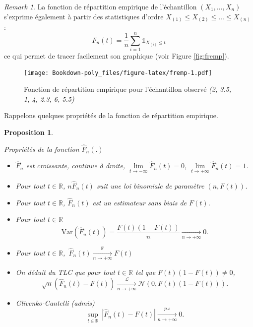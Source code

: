 \documentclass[
]{book}
\providecommand{\tightlist}{%
  \setlength{\itemsep}{0pt}\setlength{\parskip}{0pt}}
\newtheorem{proposition}{Proposition}[chapter]
\theoremstyle{definition}
\theoremstyle{definition}
\theoremstyle{definition}
\theoremstyle{definition}
\theoremstyle{remark}
\newtheorem*{remark}{Remark}
\begin{document}
\begin{remark}

La fonction de répartition empirique de l'échantillon \((X_1,\ldots,X_n)\) s'exprime également à partir des statistiques d'ordre \(X_{(1)}\leq X_{(2)}\leq \ldots\leq X_{(n)}\) :
\[
    \hat{F}_n(t)=\frac 1n \sum_{i=1}^n \mathbb{1}_{X_{(i)} \leq t}
\]
ce qui permet de tracer facilement son graphique (voir Figure \ref{fig:fremp}).

\end{remark}

\begin{figure}
\centering
\texttt{[image: Bookdown-poly\_files/figure-latex/fremp-1.pdf]}
\caption{\label{fig:fremp}\label{fremp} Fonction de répartition empirique pour l'échantillon observé \emph{(2, 3.5, 1, 4, 2.3, 6, 5.5)}}
\end{figure}

Rappelons quelques propriétés de la fonction de répartition empirique.

\begin{proposition}
\protect\hypertarget{prp:unlabeled-div-16}{}\label{prp:unlabeled-div-16}

Propriétés de la fonction \(\hat{F}_n(.)\)

\begin{itemize}
\tightlist
\item
  \(\hat{F}_n\) est croissante, continue à droite, \(\underset{t\rightarrow -\infty}{\lim}\hat{F}_n(t)=0\), \(\underset{t\rightarrow +\infty}{\lim}\hat F_n(t)=1\).
\item
  Pour tout \(t\in\mathbb{R}\), \(n \hat{F}_n(t)\) suit une loi binomiale de paramètre \((n, F(t))\).
\item
  Pour tout \(t\in\mathbb{R}\), \(\hat{F}_n(t)\) est un estimateur sans biais de \(F(t)\).
\item
  Pour tout \(t\in\mathbb{R}\)
  \[ \mbox{Var}(\hat{F}_n(t))=\frac{F(t)(1-F(t))}{n} \underset{n\rightarrow +\infty}{\longrightarrow} 0.\]
\item
  Pour tout \(t\in\mathbb{R}\),~\(\hat{F}_n(t) \underset{n\rightarrow+\infty}{\stackrel{\mathbb{P}}{\longrightarrow}}F(t)\)
\item
  On déduit du TLC que pour tout \(t\in\mathbb{R}\) tel que \(F(t)(1-F(t))\neq 0\),
  \[\sqrt{n} (\hat F_n(t)-F(t)) \underset{n\rightarrow+\infty}{\stackrel{\mathcal L}{\longrightarrow}} \mathcal{N} (0, F(t)(1-F(t))).\]
\item
  Glivenko-Cantelli (admis)
  \[
  \underset{t\in\mathbb{R}}{\sup}\  | \hat F_n(t) - F(t) | \underset{n \rightarrow +\infty}{\stackrel{p.s}{\longrightarrow}} 0.
  \]
\end{itemize}

\end{proposition}
\end{document}
